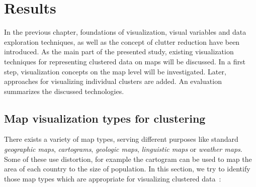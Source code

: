 
%
%

\chapter{Results}
\label{state-vis}

In the previous chapter, foundations of visualization, visual variables and data exploration techniques, as well as the concept of clutter reduction have been introduced. As the main part of the presented study, existing visualization techniques for representing clustered data on maps will be discussed. In a first step, visualization concepts on the map level will be investigated. Later, approaches for visualizing individual clusters are added. An evaluation summarizes the discussed technologies.

\section{Map visualization types for clustering}
\label{chapter:map-vis}

There exists a variety of map types, serving different purposes like standard \textit{geographic maps}, \textit{cartograms}, \textit{geologic maps}, \textit{linguistic maps} or \textit{weather maps}. Some of these use distortion, for example the cartogram can be used to map the area of each country to the size of population. In this section, we try to identify those map types which are appropriate for visualizing clustered data~\cite{noellenburg11geovis, wiki:map-types}:

